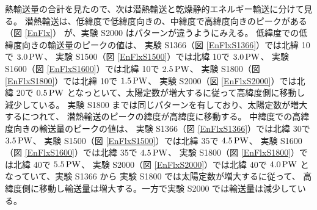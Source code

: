\documentclass[body]{subfiles}
\begin{document}
熱輸送量の合計を見たので、次は潜熱輸送と乾燥静的エネルギー輸送に分けて見る。
潜熱輸送は、低緯度で低緯度向きの、中緯度で高緯度向きのピークがある（図 \ref{EnFlx}）
が、実験 S2000 はパターンが違うようにみえる。
低緯度での低緯度向きの輸送量のピークの値は、
実験 S1366（図 \ref{EnFlxS1366}）では北緯 10\textdegree で \(3.0\hmu{PW}\)、
実験 S1500（図 \ref{EnFlxS1500}）では北緯 10\textdegree で \(3.0\hmu{PW}\)、
実験 S1600（図 \ref{EnFlxS1600}）では北緯 10\textdegree で \(2.5\hmu{PW}\)、
実験 S1800（図 \ref{EnFlxS1800}）では北緯 10\textdegree で \(1.5\hmu{PW}\)、
実験 S2000（図 \ref{EnFlxS2000}）では北緯 20\textdegree で \(0.5\hmu{PW}\)
となっといて、太陽定数が増大するに従って高緯度側に移動し減少している。
実験 S1800 までは同じパターンを有しており、太陽定数が増大するにつれて、
潜熱輸送のピークの緯度が高緯度に移動する。
中緯度での高緯度向きの輸送量のピークの値は、
実験 S1366（図 \ref{EnFlxS1366}）では北緯 30\textdegree で \(3.5\hmu{PW}\)、
実験 S1500（図 \ref{EnFlxS1500}）では北緯 35\textdegree で \(4.5\hmu{PW}\)、
実験 S1600（図 \ref{EnFlxS1600}）では北緯 35\textdegree で \(4.5\hmu{PW}\)、
実験 S1800（図 \ref{EnFlxS1800}）では北緯 40\textdegree で \(5.5\hmu{PW}\)、
実験 S2000（図 \ref{EnFlxS2000}）では北緯 40\textdegree で \(4.0\hmu{PW}\)
となっていて、実験 S1366 から 実験 S1800 では太陽定数が増大するに従って、
高緯度側に移動し輸送量は増大する。一方で実験 S2000 では輸送量は減少している。
\end{document}
